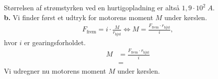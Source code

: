 \documentclass{report}
\begin{document}
Størrelsen af strømstyrken ved en hurtigopladning er altså $1,9 \cdot 10^2 \;\unit{A} $.\\[1ex]
\textbf{b.}
Vi finder først et udtryk for motorens moment $M$ under kørslen. 
\begin{equation*}
\begin{split}
  F _{\text{frem} }= i \cdot \frac{M}{r _{\text{hjul} }} \iff M=\frac{F _{\text{frem} } \cdot r _{\text{hjul} }}{i},
\end{split}
\end{equation*}
hvor $i$ er gearingsforholdet. 
\begin{equation*}
\begin{split}
  M&=\frac{F _{\text{frem} } \cdot r _{\text{hjul} }}{i}\\
  &=
\end{split}
\end{equation*}
Vi udregner nu motorens moment $M$ under kørslen. 
\end{document}
